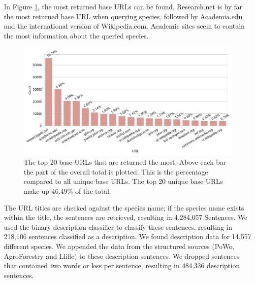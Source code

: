 \documentclass[a4paper, 12pt, oneside]{book} %
\begin{document}
In Figure \ref{fig:URL_top20}, the most returned base URLs can be found.
Research.net is by far the most returned base URL when querying species, followed by Academia.edu and the international version of Wikipedia.com.
Academic sites seem to contain the most information about the queried species.
\begin{figure}[t]
 \centering
 \includegraphics[width=\textwidth]{figures/URL_top20.pdf}
 \caption[The top 20 returned base URLs]{The top 20 base URLs that are returned the most. Above each bar the part of the overall total is plotted. This is the percentage compared to all unique base URLs. The top 20 unique base URLs make up 46.49\% of the total.}
 \label{fig:URL_top20}
\end{figure}

The URL titles are checked against the species name; if the species name exists within the title, the sentences are retrieved, resulting in 4,284,057 Sentences.
We used the binary description classifier to classify these sentences, resulting in 218,106 sentences classified as a description.
We found description data for 14,557 different species.
We appended the data from the structured sources (PoWo, AgroForestry and Llifle) to these description sentences.
We dropped sentences that contained two words or less per sentence, resulting in 484,336 description sentences.
\end{document}
